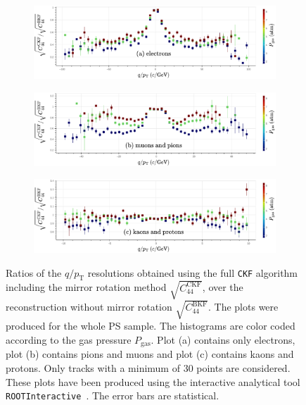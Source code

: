 \begin{figure}[!ht]
     \centering
     \begin{subfigure}[h!]{0.9\textwidth}
         \centering
         \includegraphics[width=\textwidth]{figures/ch5-KF_NDGAr/ToySample/ParScan/TotVSLegVSdens_11_label.eps}
         \caption{}
         \label{fig:SingleVSLeg_e}
     \end{subfigure}
     \begin{subfigure}[b]{0.9\textwidth}
         \centering
         \includegraphics[width=\textwidth]{figures/ch5-KF_NDGAr/ToySample/ParScan/TotVSLegVSdens_13_211_label.eps}
         \caption{}
         \label{fig:SingleVSLeg_mu_pi}
     \end{subfigure}
          \begin{subfigure}[b]{0.9\textwidth}
         \centering
         \includegraphics[width=\textwidth]{figures/ch5-KF_NDGAr/ToySample/ParScan/TotVSLegVSdens_2212_321_label.eps}
         \caption{}
         \label{fig:SingleVSLeg_proton_kaon}
     \end{subfigure}
        \caption[Ratios of the $q/p_\text{T}$ resolutions obtained using the full \texttt{CKF} algorithm including the mirror rotation method $\sqrt{C_{44}^{\textrm{CKF}}}$, over the reconstruction without mirror rotation $\sqrt{C_{44}^{\text{BKF}}}$.]{Ratios of the $q/p_\text{T}$ resolutions obtained using the full \texttt{CKF} algorithm including the mirror rotation method $\sqrt{C_{44}^{\textrm{CKF}}}$, over the reconstruction without mirror rotation $\sqrt{C_{44}^{\text{BKF}}}$. The plots were produced for the whole PS sample. The histograms are color coded according to the gas pressure $P_{\textrm{gas}}$. Plot (a) contains only electrons, plot (b) contains pions and muons and plot (c) contains kaons and protons. Only tracks with a minimum of 30 points are considered. These plots have been produced using the interactive analytical tool \texttt{ROOTInteractive}~\cite{RootInt}. The error bars are statistical.}
        \label{fig:SingleVSLeg_dens}
\end{figure}

